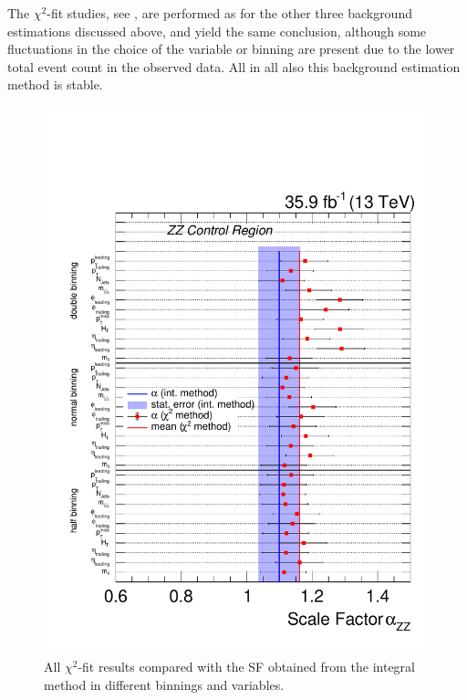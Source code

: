 The $\chi^2$-fit studies, see , are performed as for the other three background estimations discussed above, and yield the same conclusion, although some fluctuations in the choice of the variable or binning are present due to the lower total event count in the observed data. All in all also this background estimation method is stable.
\begin{figure}[tbp]
 \centering
 \includegraphics[width=\pairwidth]{figures/plots_CR/chi/ZZ_Compare}
 \caption{All $\chi^2$-fit results compared with the SF obtained from the integral method in different binnings and variables.}
 \label{fig:chiZZ}
\end{figure}

